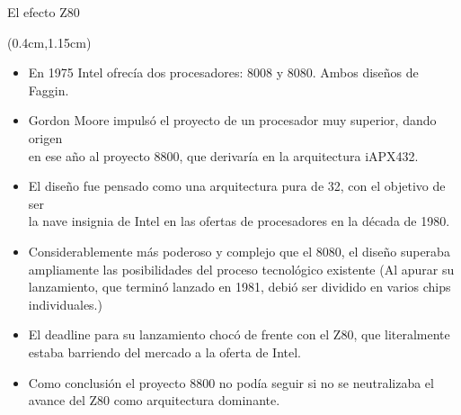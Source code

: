 \documentclass[table,dvipsnames,aspectratio=169]{beamer}
\begin{document}
\begin{frame}{El efecto Z80}
 \begin{textblock*}{\textwidth}(0.4cm,1.15cm)
  \begin{itemize} [<+(1)->] \justifying \parskip 0.1cm
   \item En 1975 Intel ofrecía dos procesadores: 8008 y 8080. Ambos diseños de Faggin.
   \item \textcolor{furfiBlue}{Gordon Moore impulsó el proyecto de un procesador muy superior, dando origen\\
   en ese año al proyecto 8800, que derivaría en la arquitectura iAPX432.}
   \item El diseño fue pensado como una arquitectura pura de \SI{32}{\bit}, con el objetivo de ser\\
   la \textcolor{furfiBlue}{nave insignia} de Intel en las ofertas de procesadores en la década de 1980.
   \item Considerablemente más poderoso y complejo que el 8080, el diseño superaba\\
   ampliamente las posibilidades del proceso tecnológico existente {\small \textcolor{furfiGray}{(Al apurar su\\
   lanzamiento, que terminó lanzado en 1981, debió ser dividido en varios chips individuales.)}}
   \item El deadline para su lanzamiento chocó de frente con el Z80, que literalmente\\
   \textcolor{furfiBlue}{estaba barriendo del mercado} a la oferta de Intel.
   \item Como conclusión el proyecto 8800 no podía seguir \textcolor{furfiBlue}{si no se neutralizaba el\\
   avance del Z80} como arquitectura dominante.
  \end{itemize}
 \end{textblock*}
\end{frame}
\end{document}
